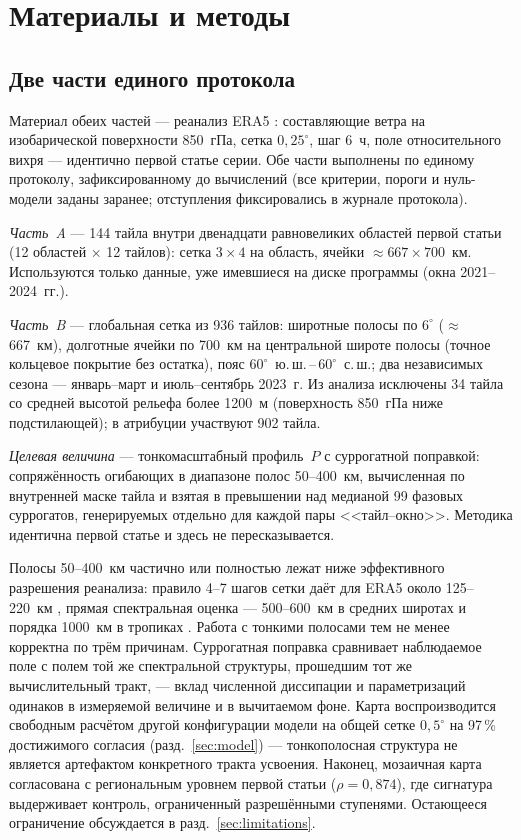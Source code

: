 \documentclass[11pt,a4paper]{article}
\begin{document}
\section{Материалы и методы}
\label{sec:data}

\subsection{Две части единого протокола}

Материал обеих частей --- реанализ ERA5 \cite{Hersbach2020,Soci2024}: составляющие ветра на изобарической поверхности 850~гПа, сетка $0{,}25^\circ$, шаг 6~ч, поле относительного вихря --- идентично первой статье серии. Обе части выполнены по единому протоколу, зафиксированному до вычислений (все критерии, пороги и нуль-модели заданы заранее; отступления фиксировались в журнале протокола).

\emph{Часть~A} --- 144 тайла внутри двенадцати равновеликих областей первой статьи (12 областей $\times$ 12 тайлов): сетка $3\times4$ на область, ячейки $\approx667\times700$~км. Используются только данные, уже имевшиеся на диске программы (окна 2021--2024~гг.).

\emph{Часть~B} --- глобальная сетка из 936 тайлов: широтные полосы по $6^\circ$ ($\approx$667~км), долготные ячейки по 700~км на центральной широте полосы (точное кольцевое покрытие без остатка), пояс $60^\circ$~ю.\,ш.\,--\,$60^\circ$~с.\,ш.; два независимых сезона --- январь--март и июль--сентябрь 2023~г. Из анализа исключены 34 тайла со средней высотой рельефа более 1200~м (поверхность 850~гПа ниже подстилающей); в атрибуции участвуют 902 тайла.

\emph{Целевая величина} --- тонкомасштабный профиль~$P$ с суррогатной поправкой: сопряжённость огибающих в диапазоне полос 50--400~км, вычисленная по внутренней маске тайла и взятая в превышении над медианой 99 фазовых суррогатов, генерируемых отдельно для каждой пары <<тайл--окно>>. Методика идентична первой статье и здесь не пересказывается.

Полосы 50--400~км частично или полностью лежат ниже эффективного разрешения реанализа: правило 4--7 шагов сетки даёт для ERA5 около 125--220~км \cite{Skamarock2004}, прямая спектральная оценка --- 500--600~км в средних широтах и порядка 1000~км в тропиках \cite{Bolgiani2022}. Работа с тонкими полосами тем не менее корректна по трём причинам. Суррогатная поправка сравнивает наблюдаемое поле с полем той же спектральной структуры, прошедшим тот же вычислительный тракт, --- вклад численной диссипации и параметризаций одинаков в измеряемой величине и в вычитаемом фоне. Карта воспроизводится свободным расчётом другой конфигурации модели на общей сетке $0{,}5^\circ$ на 97\,\% достижимого согласия (разд.~\ref{sec:model}) --- тонкополосная структура не является артефактом конкретного тракта усвоения. Наконец, мозаичная карта согласована с региональным уровнем первой статьи ($\rho=0{,}874$), где сигнатура выдерживает контроль, ограниченный разрешёнными ступенями. Остающееся ограничение обсуждается в разд.~\ref{sec:limitations}.
\end{document}
